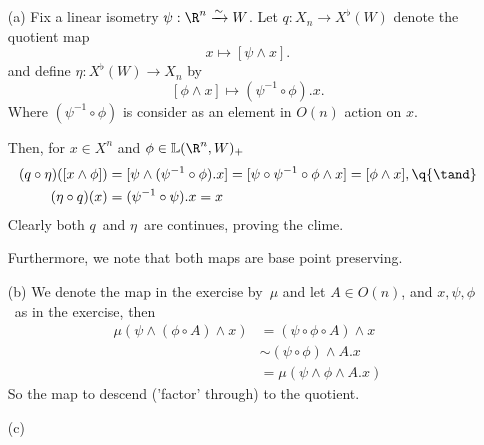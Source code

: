 
\def \L{\mathbb{L}}
\def \simto{\xrightarrow{\sim}}
\def \O{\mathcal{O}}


\mmaketitle

\begin{exercise}[1]\ 
\end{exercise}

\begin{exercise}[2]\ 
\begin{enumerate}
\item[(a)]
Fix a linear isometry $\psi: \R^n \simto W$. Let 
$q : X_n \to X^\flat(W)$ denote the quotient map 
\[ x \mapsto [\psi \wedge x]. \]
and define $\eta: X^\flat(W) \to X_n$ by 
\[ [\phi \wedge x] \mapsto (\psi^{-1} \circ \phi) . x. \]
Where $(\psi^{-1} \circ \phi)$ is consider as an element in $O(n)$ action on
$x$.

Then, for $x \in X^n$ and $\phi \in \L(\R^n, W)_+$ 
\begin{align*}
(q \circ \eta) ([x \wedge \phi]) 
&= [\psi \wedge (\psi^{-1} \circ \phi) . x ] 
= [\psi \circ \psi^{-1} \circ \phi \wedge x]
= [\phi \wedge x], \q{\tand} \\
(\eta \circ q) (x) 
&= (\psi^{-1} \circ \psi) . x 
= x
\end{align*}
Clearly both $q$ and $\eta$ are continues, proving the clime.

Furthermore, we note that both maps are base point preserving.

\item[(b)]
We denote the map in the exercise by $\mu$ and
let $A \in O(n)$, and $x, \psi, \phi$ as in the exercise, then 
\begin{align*}
\mu( \psi \wedge (\phi \circ A) \wedge x ) 
&= (\psi \circ \phi \circ A) \wedge x  \\
&\sim (\psi \circ \phi) \wedge A . x \\
&= \mu( \psi \wedge \phi \wedge A . x ) 
\end{align*}
So the map to descend ('factor' through) to the quotient. 

\item[(c)]


\end{enumerate}
\end{exercise}
